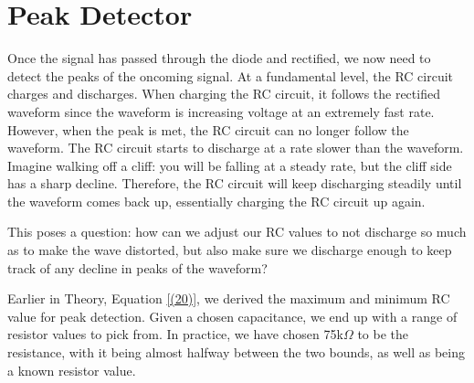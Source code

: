 \section{Peak Detector}

Once the signal has passed through the diode and rectified, we now need to detect the peaks of the oncoming signal. At a fundamental level, the RC circuit charges and discharges. When charging the RC circuit, it follows the rectified waveform since the waveform is increasing voltage at an extremely fast rate. However, when the peak is met, the RC circuit can no longer follow the waveform. The RC circuit starts to discharge at a rate slower than the waveform. Imagine walking off a cliff: you will be falling at a steady rate, but the cliff side has a sharp decline. Therefore, the RC circuit will keep discharging steadily until the waveform comes back up, essentially charging the RC circuit up again.

This poses a question: how can we adjust our RC values to not discharge so much as to make the wave distorted, but also make sure we discharge enough to keep track of any decline in peaks of the waveform?

Earlier in Theory, Equation \ref{(20)}, we derived the maximum and minimum RC value for peak detection. Given a chosen capacitance, we end up with a range of resistor values to pick from. In practice, we have chosen 75k$\Omega$ to be the resistance, with it being almost halfway between the two bounds, as well as being a known resistor value. 